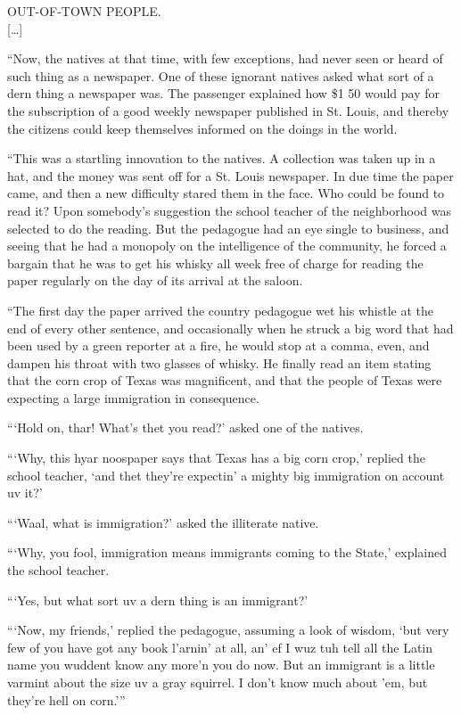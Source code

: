 \begin{ipquote}
\begin{center}
OUT-OF-TOWN PEOPLE.\\
{[…]}
\end{center}
“Now, the natives at that time, with few exceptions, had never seen or heard of such thing as a newspaper. One of these ignorant natives asked what sort of a dern thing a newspaper was. The passenger explained how \$1 50 would pay for the subscription of a good weekly newspaper published in St. Louis, and thereby the citizens could keep themselves informed on the doings in the world.

“This was a startling innovation to the natives. A collection was taken up in a hat, and the money was sent off for a St. Louis newspaper. In due time the paper came, and then a new difficulty stared them in the face. Who could be found to read it? Upon somebody’s suggestion the school teacher of the neighborhood was selected to do the reading. But the pedagogue had an eye single to business, and seeing that he had a monopoly on the intelligence of the community, he forced a bargain that he was to get his whisky all week free of charge for reading the paper regularly on the day of its arrival at the saloon.

“The first day the paper arrived the country pedagogue wet his whistle at the end of every other sentence, and occasionally when he struck a big word that had been used by a green reporter at a fire, he would stop at a comma, even, and dampen his throat with two glasses of whisky. He finally read an item stating that the corn crop of Texas was magnificent, and that the people of Texas were expecting a large immigration in consequence.

“‘Hold on, thar! What’s thet you read?’ asked one of the natives.

“‘Why, this hyar noospaper says that Texas has a big corn crop,’ replied the school teacher, ‘and thet they’re expectin’ a mighty big immigration on account uv it?’

“‘Waal, what is immigration?’ asked the illiterate native.

“‘Why, you fool, immigration means immigrants coming to the State,’ explained the school teacher.

“‘Yes, but what sort uv a dern thing is an immigrant?’

“‘Now, my friends,’ replied the pedagogue, assuming a look of wisdom, ‘but very few of you have got any book l’arnin’ at all, an’ ef I wuz tuh tell all the Latin name you wuddent know any more’n you do now. But an immigrant is a little varmint about the size uv a gray squirrel. I don’t know much about ’em, but they’re hell on corn.’”
\end{ipquote}

